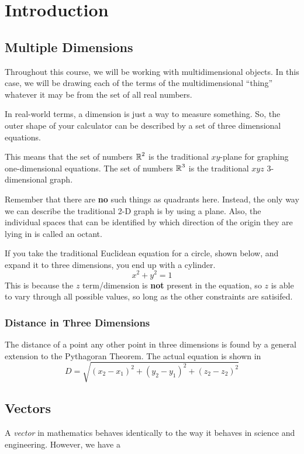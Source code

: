 \section{Introduction}\label{sec:Intro}
\subsection{Multiple Dimensions}\label{subsec:Multiple_Dimensions}
Throughout this course, we will be working with multidimensional objects.
In this case, we will be drawing each of the terms of the multidimensional ``thing'' whatever it may be from the set of all real numbers.

In real-world terms, a dimension is just a way to measure something.
So, the outer shape of your calculator can be described by a set of three dimensional equations.

This means that the set of numbers $\operatorname{\mathbb{R}}^{2}$ is the traditional $xy$-plane for graphing one-dimensional equations.
The set of numbers $\operatorname{\mathbb{R}}^{3}$ is the traditional $xyz$ 3-dimensional graph.

\begin{remark*}
  Remember that there are \textbf{no} such things as quadrants here.
  Instead, the only way we can describe the traditional 2-D graph is by using a plane.
  Also, the individual spaces that can be identified by which direction of the origin they are lying in is called an octant.
\end{remark*}

If you take the traditional Euclidean equation for a circle, shown below, and expand it to three dimensions, you end up with a cylinder.
\begin{equation*}
  x^{2} + y^{2} = 1
\end{equation*}
This is because the $z$ term/dimension is \textbf{not} present in the equation, so $z$ is able to vary through all possible values, so long as the other constraints are satisifed.

\subsubsection{Distance in Three Dimensions}\label{subsubsec:3D_Distance}
The distance of a point any other point in three dimensions is found by a general extension to the Pythagoran Theorem.
The actual equation is shown in 
\begin{equation}\label{eq:3D_Distance}
  D = \sqrt{{(x_{2}-x_{1})}^{2} + {(y_{2}-y_{1})}^{2} + {(z_{2}-z_{2})}^{2}}
\end{equation}

\subsection{Vectors}
\begin{definition}[Vector]\label{def:Vector}
  A \emph{vector} in mathematics behaves identically to the way it behaves in science and engineering.
  However, we have a
\end{definition}

